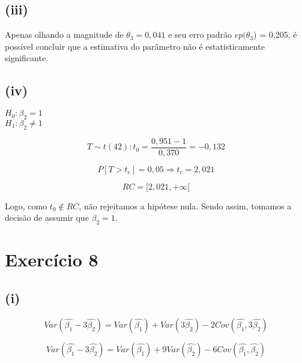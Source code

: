 \documentclass[hidelinks,11pt]{book}
\theoremstyle{definition}
\begin{document}
\subsection*{(iii)}

Apenas olhando a magnitude de $\theta_3 = 0,041$ e seu erro padrão $ep(\theta_3$) = 0,205, é possível concluir que a estimativa do parâmetro não é estatisticamente significante.

\subsection*{(iv)}

\begin{center}
	$H_0 : \beta_{2} = 1$\\
	$H_1 : \beta_{2} \not = 1$
\end{center}

\begin{displaymath}
	T \sim t(42): t_0 = \frac{0,951 - 1} {0,370} = -0,132
\end{displaymath}

\begin{displaymath}
	P[T > t_c ] = 0,05 \Rightarrow t_c = 2,021
\end{displaymath}

\begin{displaymath}
	RC = [2,021, +\infty[
\end{displaymath}

Logo, como $t_0 \not \in RC$, não rejeitamos a hipótese nula. Sendo assim, tomamos a decisão de assumir que $\beta_2 = 1$.


\section*{Exercício 8}

\subsection*{(i)}

\begin{displaymath}
	Var (\hat{\beta_1} - 3\hat{\beta_2}) = Var(\hat{\beta_1}) +  Var(3\hat{\beta_2}) -  2Cov(\hat{\beta_1}, 3\hat{\beta_2})
\end{displaymath}

\begin{displaymath}
	Var (\hat{\beta_1} - 3\hat{\beta_2}) = Var(\hat{\beta_1}) + 9 Var(\hat{\beta_2}) -  6Cov(\hat{\beta_1}, \hat{\beta_2})
\end{displaymath}
\end{document}
